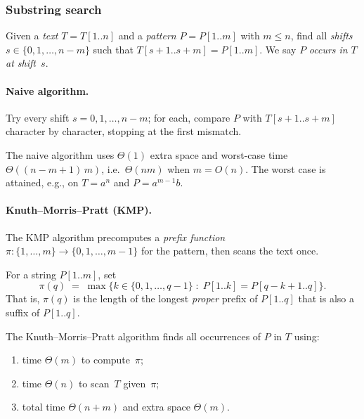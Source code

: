 \subsubsection*{Substring search}

\begin{definition}
\label{def:substring-search}
Given a \emph{text} $T = T[1..n]$ and a \emph{pattern} $P = P[1..m]$
with $m \leq n$, find all \emph{shifts} $s \in \{0, 1, \dots, n - m\}$
such that $T[s + 1 .. s + m] = P[1..m]$. We say $P$ \emph{occurs in}
$T$ \emph{at shift~$s$}.
\end{definition}

\paragraph{Naive algorithm.} Try every shift $s = 0, 1, \dots, n - m$;
for each, compare $P$ with $T[s+1..s+m]$ character by character,
stopping at the first mismatch.

\begin{proposition}
\label{prop:naive-search}
The naive algorithm uses $\Theta(1)$ extra space and worst-case time
$\Theta((n - m + 1)\, m)$, i.e.\ $\Theta(nm)$ when $m = O(n)$. The
worst case is attained, e.g., on $T = a^n$ and $P = a^{m-1} b$.
\end{proposition}

\paragraph{Knuth--Morris--Pratt (KMP).} The KMP algorithm precomputes a
\emph{prefix function} $\pi \colon \{1, \dots, m\} \to \{0, 1, \dots, m - 1\}$
for the pattern, then scans the text once.

\begin{definition}
\label{def:prefix-function}
For a string $P[1..m]$, set
\[
  \pi(q) \;=\; \max\{ k \in \{0, 1, \dots, q - 1\} \;:\; P[1..k] = P[q - k + 1 .. q] \}.
\]
That is, $\pi(q)$ is the length of the longest \emph{proper} prefix of
$P[1..q]$ that is also a suffix of $P[1..q]$.
\end{definition}

\begin{theorem}
\label{thm:kmp}
The Knuth--Morris--Pratt algorithm finds all occurrences of $P$ in $T$
using:
\begin{enumerate}[label=(\alph*)]
  \item time $\Theta(m)$ to compute~$\pi$;
  \item time $\Theta(n)$ to scan~$T$ given~$\pi$;
  \item total time $\Theta(n + m)$ and extra space $\Theta(m)$.
\end{enumerate}
\end{theorem}

